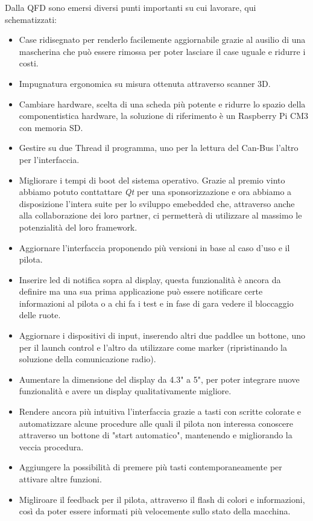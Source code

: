 Dalla QFD sono emersi diversi punti importanti su cui lavorare, qui schematizzati:

\begin{itemize}
    \item Case ridisegnato per renderlo facilemente aggiornabile grazie al ausilio di una 
            mascherina che può essere rimossa per poter lasciare il case uguale e ridurre i costi.
    \item Impugnatura ergonomica su misura ottenuta attraverso scanner 3D. 
    \item Cambiare hardware, scelta di una scheda più potente e ridurre lo spazio della componentistica hardware, 
        la soluzione di riferimento è un Raspberry Pi CM3 con memoria SD.
    \item Gestire su due Thread il programma, uno per la lettura del Can-Bus l'altro per l'interfaccia.
    \item Migliorare i tempi di boot del sistema operativo. Grazie al premio vinto 
        abbiamo potuto conttattare \emph{Qt} per una sponsorizzazione e ora abbiamo a disposizione 
        l'intera suite per lo sviluppo emebedded che, attraverso anche alla collaborazione dei loro
        partner, ci permetterà di utilizzare al massimo le potenzialità del loro framework.
    \item Aggiornare l'interfaccia proponendo più versioni in base al caso d'uso e il pilota.
    \item Inserire led di notifica sopra al display, questa funzionalità è ancora da definire ma una 
        sua prima applicazione può essere notificare certe informazioni al pilota o a 
        chi fa i test e in fase di gara vedere il bloccaggio delle ruote. 
    \item Aggiornare i dispositivi di input, inserendo altri due paddlee un bottone, uno per il launch control e 
        l'altro da utilizzare come marker (ripristinando la soluzione della comunicazione radio).
    \item Aumentare la dimensione del display da 4.3" a 5", per poter integrare nuove funzionalità e avere un display qualitativamente migliore.
    \item Rendere ancora più intuitiva l'interfaccia grazie a tasti con scritte colorate e automatizzare 
        alcune procedure alle quali il pilota non interessa conoscere attraverso un bottone di "start automatico", mantenendo e migliorando la veccia procedura.
    \item Aggiungere la possibilità di premere più tasti contemporaneamente per attivare altre funzioni.
    \item Migliroare il feedback per il pilota, attraverso il flash di colori e informazioni, 
        così da poter essere informati più velocemente sullo stato della macchina. 
\end{itemize}

